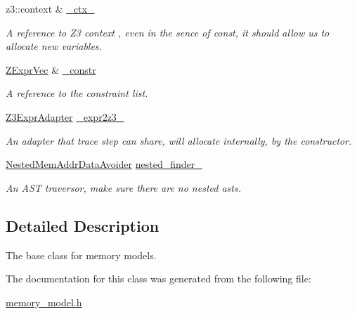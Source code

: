 \begin{DoxyCompactItemize}
\mbox{\label{classilang_1_1_memory_model_a7af961cf7b6961513c71867e1b9b4af8}} 
z3\+::context \& \mbox{\hyperlink{classilang_1_1_memory_model_a7af961cf7b6961513c71867e1b9b4af8}{\+\_\+ctx\+\_\+}}
\begin{DoxyCompactList}\small\item\em A reference to Z3 context , even in the sence of const, it should allow us to allocate new variables. \end{DoxyCompactList}\item 
\mbox{\label{classilang_1_1_memory_model_aa70fe60b32b7b9d16a77892642221123}} 
\mbox{\hyperlink{classilang_1_1_memory_model_ab0d3de967acef0330edf4d65d5782ce5}{Z\+Expr\+Vec}} \& \mbox{\hyperlink{classilang_1_1_memory_model_aa70fe60b32b7b9d16a77892642221123}{\+\_\+constr}}
\begin{DoxyCompactList}\small\item\em A reference to the constraint list. \end{DoxyCompactList}\item 
\mbox{\label{classilang_1_1_memory_model_ae633b09d2c3afd2b70ba20d3dc4bb54f}} 
\mbox{\hyperlink{classilang_1_1_z3_expr_adapter}{Z3\+Expr\+Adapter}} \mbox{\hyperlink{classilang_1_1_memory_model_ae633b09d2c3afd2b70ba20d3dc4bb54f}{\+\_\+expr2z3\+\_\+}}
\begin{DoxyCompactList}\small\item\em An adapter that trace step can share, will allocate internally, by the constructor. \end{DoxyCompactList}\item 
\mbox{\label{classilang_1_1_memory_model_a62957cb1ce34cf1b0248e32b336aa79e}} 
\mbox{\hyperlink{classilang_1_1_nested_mem_addr_data_avoider}{Nested\+Mem\+Addr\+Data\+Avoider}} \mbox{\hyperlink{classilang_1_1_memory_model_a62957cb1ce34cf1b0248e32b336aa79e}{nested\+\_\+finder\+\_\+}}
\begin{DoxyCompactList}\small\item\em An A\+ST traversor, make sure there are no nested asts. \end{DoxyCompactList}\end{DoxyCompactItemize}


\subsection{Detailed Description}
The base class for memory models. 

The documentation for this class was generated from the following file\+:\begin{DoxyCompactItemize}
\item 
\mbox{\hyperlink{memory__model_8h}{memory\+\_\+model.\+h}}\end{DoxyCompactItemize}
